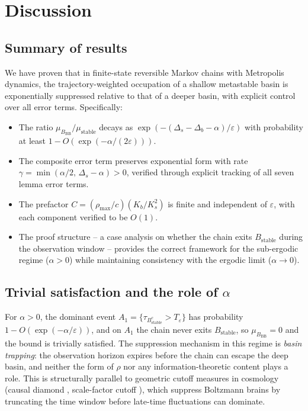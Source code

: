 \documentclass[11pt]{article}
\newcommand{\eps}{\varepsilon}
\newcommand{\Ds}{\Delta_s}
\newcommand{\Db}{\Delta_b}
\newcommand{\Bstable}{B_{\mathrm{stable}}}
\newcommand{\BBB}{B_{\mathrm{BB}}}
\newcommand{\Teps}{T_\eps}
\newcommand{\muBB}{\mu_{\BBB}}
\begin{document}
\section{Discussion}
\label{sec:discussion}

\subsection{Summary of results}

We have proven that in finite-state reversible Markov chains with
Metropolis dynamics, the trajectory-weighted occupation of a shallow
metastable basin is exponentially suppressed relative to that of a
deeper basin, with explicit control over all error terms.
Specifically:

\begin{itemize}
\item The ratio $\muBB/\mu_{\mathrm{stable}}$ decays as
  $\exp(-(\Ds - \Db - \alpha)/\eps)$ with probability at least
  $1 - O(\exp(-\alpha/(2\eps)))$.

\item The composite error term preserves exponential form with
  rate $\gamma = \min(\alpha/2,\, \Ds - \alpha) > 0$, verified
  through explicit tracking of all seven lemma error terms.

\item The prefactor $C = (\rho_{\max}/c)(K_b/K_s^2)$ is finite and
  independent of $\eps$, with each component verified to be $O(1)$.

\item The proof structure -- a case analysis on whether the chain
  exits $\Bstable$ during the observation window -- provides the
  correct framework for the sub-ergodic regime ($\alpha > 0$) while
  maintaining consistency with the ergodic limit ($\alpha \to 0$).
\end{itemize}

\subsection{Trivial satisfaction and the role of $\alpha$}

For $\alpha > 0$, the dominant event $A_1 = \{\tau_{\Bstable^c} >
\Teps\}$ has probability $1 - O(\exp(-\alpha/\eps))$, and on $A_1$
the chain never exits $\Bstable$, so $\muBB = 0$ and the bound is
trivially satisfied.  The suppression mechanism in this regime is
\emph{basin trapping}: the observation horizon expires before the
chain can escape the deep basin, and neither the form of $\rho$ nor
any information-theoretic content plays a role.  This is structurally
parallel to geometric cutoff measures in cosmology (causal diamond
\cite{Bousso2006}, scale-factor cutoff \cite{DeSimone2010}), which
suppress Boltzmann brains by truncating the time window before
late-time fluctuations can dominate.
\end{document}

